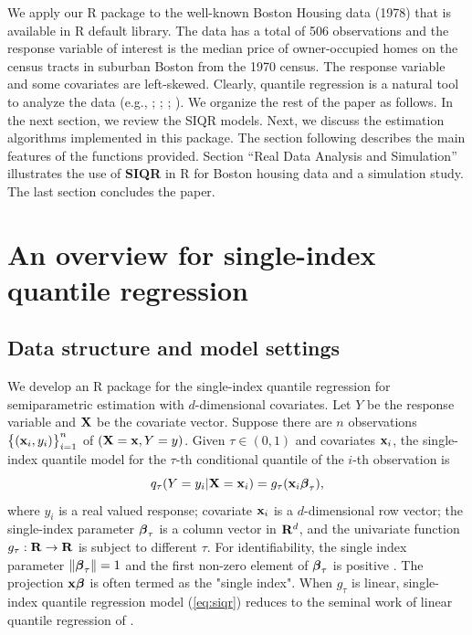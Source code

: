We apply our R package  to the well-known Boston Housing data (1978) that is available in R default library. The data has a total of 506 observations and the response variable of interest is the median price of owner-occupied homes on the census
tracts in suburban Boston from the 1970 census.
The response variable and some covariates are left-skewed. Clearly, quantile regression is a natural tool to analyze the data (e.g., \citealt{chaudhuri_average_1997}; \citealt{yu_local_2004}; \citealt{wu_single-index_2010}; \citealt{kong_single-index_2012}). We organize the rest of the paper as follows. In the next section, we review the SIQR models. Next, we discuss the estimation algorithms implemented in this package.  The section following describes the main features of the functions provided. Section ``Real Data Analysis and Simulation'' illustrates the use of \textbf{SIQR} in R for Boston housing data and a simulation study. The last section concludes the paper.

\section{An overview for single-index quantile regression}


\subsection{Data structure and model settings}

We develop an R package for the single-index quantile regression for semiparametric estimation with $d$-dimensional covariates.
Let $Y$ be the response variable and ${\bf X}$ be the covariate vector. 
Suppose there are $n$ observations $\bigl\{({\bf x}_i,y_i)\bigr\}_{i=1}^n$ of $({\bf X}={\bf x},Y=y)$. Given $\tau\in(0,1)$ and covariates ${\bf x}_i$, the single-index quantile model for the $\tau$-th conditional quantile of the $i$-th observation is
\begin{equation} \label{eq:siqr}
q_{\tau}(Y=y_i | {\bf X}={\bf x}_i) = g_\tau ({\bf x}_i \mbox{\boldmath$\beta$}_{\tau}),
\end{equation}
where $y_i$ is a real valued response; covariate ${\bf x}_i$ is a $d$-dimensional row vector; the single-index parameter $\mbox{\boldmath$\beta$}_{\tau}$ is a column vector in ${\bf R}^d$, and the univariate function $g_{\tau}: {\bf R} \rightarrow {\bf R}$ is subject to different $\tau$.
	For identifiability, the single index parameter $\|\mbox{\boldmath$\beta$}_{\tau}\|= 1$ and the first non-zero element of $\mbox{\boldmath$\beta$}_{\tau}$ is positive \citep{yu_penalized_2002}. The projection ${\bf x}\mbox{\boldmath$\beta$}$ is often termed as the "single index".
When $g_{\tau}$ is linear, single-index quantile regression model (\ref{eq:siqr}) reduces to the seminal work of linear quantile regression of \cite{koenker_regression_1978}.



